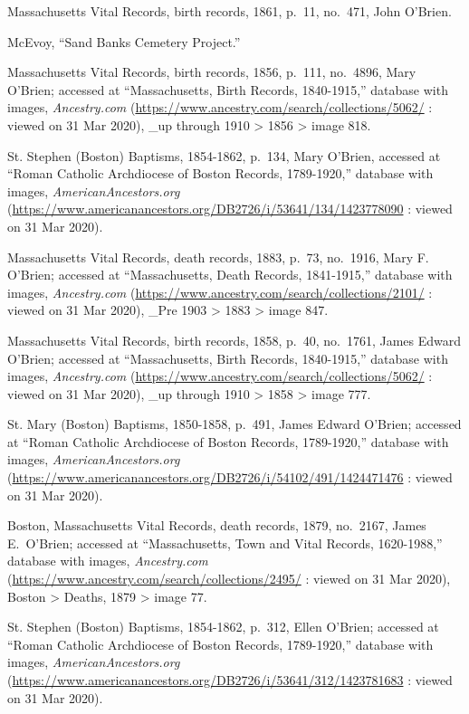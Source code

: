 \begin{thebibliography}{999}
Massachusetts Vital Records, birth records, 1861, p.\ 11, no.\ 471, John O'Brien.

McEvoy, ``Sand Banks Cemetery Project.'' 

Massachusetts Vital Records, birth records, 1856, p.\ 111, no.\ 4896, Mary O'Brien; accessed at ``Massachusetts, Birth Records, 1840-1915,'' database with images, \textit{Ancestry.com} (\url{https://www.ancestry.com/search/collections/5062/} : viewed on 31 Mar 2020), \_up through 1910 > 1856 > image 818.

St. Stephen (Boston) Baptisms, 1854-1862, p.\ 134, Mary O'Brien, accessed at ``Roman Catholic Archdiocese of Boston Records, 1789-1920,'' database with images, \textit{AmericanAncestors.org} (\url{https://www.americanancestors.org/DB2726/i/53641/134/1423778090} : viewed on 31 Mar 2020).

Massachusetts Vital Records, death records, 1883, p.\ 73, no.\ 1916, Mary F. O'Brien; accessed at ``Massachusetts, Death Records, 1841-1915,'' database with images, \textit{Ancestry.com} (\url{https://www.ancestry.com/search/collections/2101/} : viewed on 31 Mar 2020), \_Pre 1903 > 1883 > image 847.

Massachusetts Vital Records, birth records, 1858, p.\ 40, no.\ 1761, James Edward O'Brien; accessed at ``Massachusetts, Birth Records, 1840-1915,'' database with images, \textit{Ancestry.com} (\url{https://www.ancestry.com/search/collections/5062/} : viewed on 31 Mar 2020), \_up through 1910 > 1858 > image 777.

St. Mary (Boston) Baptisms, 1850-1858, p.\ 491, James Edward O'Brien; accessed at ``Roman Catholic Archdiocese of Boston Records, 1789-1920,'' database with images, \textit{AmericanAncestors.org} (\url{https://www.americanancestors.org/DB2726/i/54102/491/1424471476} : viewed on 31 Mar 2020).

Boston, Massachusetts Vital Records, death records, 1879, no.\ 2167, James E.\ O'Brien; accessed at ``Massachusetts, Town and Vital Records, 1620-1988,'' database with images, \textit{Ancestry.com} (\url{https://www.ancestry.com/search/collections/2495/} : viewed on 31 Mar 2020), Boston > Deaths, 1879 > image 77.

St. Stephen (Boston) Baptisms, 1854-1862, p.\ 312, Ellen O'Brien; accessed at ``Roman Catholic Archdiocese of Boston Records, 1789-1920,'' database with images, \textit{AmericanAncestors.org} (\url{https://www.americanancestors.org/DB2726/i/53641/312/1423781683} : viewed on 31 Mar 2020).


\end{thebibliography}
